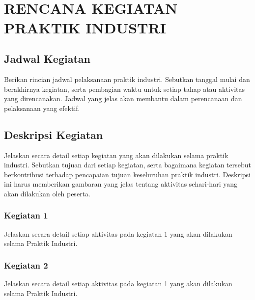 
\chapter[RENCANA KEGIATAN PRAKTIK INDUSTRI]{\\ RENCANA KEGIATAN PRAKTIK INDUSTRI}

\section{Jadwal Kegiatan}
Berikan rincian jadwal pelaksanaan praktik industri. Sebutkan tanggal mulai dan berakhirnya kegiatan, serta pembagian waktu untuk setiap tahap atau aktivitas yang direncanakan. Jadwal yang jelas akan membantu dalam perencanaan dan pelaksanaan yang efektif.

\section{Deskripsi Kegiatan}
Jelaskan secara detail setiap kegiatan yang akan dilakukan selama praktik industri. Sebutkan tujuan dari setiap kegiatan, serta bagaimana kegiatan tersebut berkontribusi terhadap pencapaian tujuan keseluruhan praktik industri. Deskripsi ini harus memberikan gambaran yang jelas tentang aktivitas sehari-hari yang akan dilakukan oleh peserta.

\subsection{Kegiatan 1}
Jelaskan secara detail setiap aktivitas pada kegiatan 1 yang akan dilakukan selama Praktik Industri.

\subsection{Kegiatan 2}
Jelaskan secara detail setiap aktivitas pada kegiatan 1 yang akan dilakukan selama Praktik Industri.

